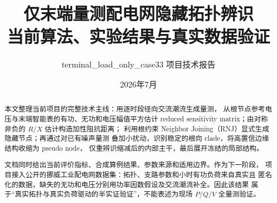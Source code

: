 \documentclass[UTF8,11pt]{ctexart}
\title{仅末端量测配电网隐藏拓扑辨识\\
当前算法、实验结果与真实数据验证}
\author{terminal\_load\_only\_case33 项目技术报告}
\date{2026年7月}
\begin{document}
\maketitle

\begin{abstract}
本文整理当前项目的完整技术主线：用逐时段径向交流潮流生成量测，
从根节点参考电压与末端智能表的有功、无功和电压幅值平方估计
reduced sensitivity matrix；由对称非负的 $R/X$ 估计构造加性阻抗距离；
利用根约束 Neighbor Joining（RNJ）显式生成隐藏节点；再通过对已有噪声量测
叠加小扰动，识别稳定的根向 clade，将高置信边缘结构收缩为 pseudo node，
仅重辨识缩减后的内部主干，最后展开冻结的局部结构。

文档同时给出当前评价指标、合成算例结果、参数来源和适用边界。作为下一阶段，
项目接入公开的挪威工业配电网数据集：拓扑、支路参数和小时有功负荷来自真实且
匿名化的数据，缺失的无功和电压分别用功率因数假设及交流潮流补全。因此该结果
属于“真实拓扑与真实负荷驱动的半实证验证”，不能表述为现场 $P/Q/V$ 全量测验证。
\end{abstract}

\tableofcontents
\newpage











\end{document}
